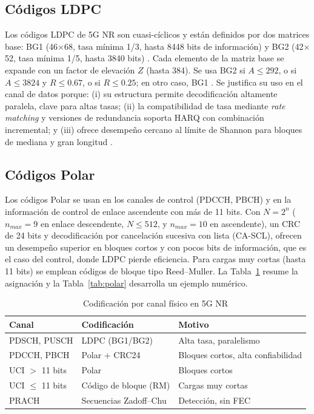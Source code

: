 \documentclass[conference]{IEEEtran}
\begin{document}
\subsection{Códigos LDPC}
Los códigos LDPC de 5G NR son cuasi-cíclicos y están definidos por dos matrices base: BG1 (46$\times$68, tasa mínima 1/3, hasta 8448 bits de información) y BG2 (42$\times$52, tasa mínima 1/5, hasta 3840 bits) \cite{richardson,ts38212}. Cada elemento de la matriz base se expande con un factor de elevación $Z$ (hasta 384). Se usa BG2 si $A\le292$, o si $A\le3824$ y $R\le0.67$, o si $R\le0.25$; en otro caso, BG1 \cite{ts38212}. Se justifica su uso en el canal de datos porque: (i) su estructura permite decodificación altamente paralela, clave para altas tasas; (ii) la compatibilidad de tasa mediante \textit{rate matching} y versiones de redundancia soporta HARQ con combinación incremental; y (iii) ofrece desempeño cercano al límite de Shannon para bloques de mediana y gran longitud \cite{richardson}.

\subsection{Códigos Polar}
Los códigos Polar \cite{arikan} se usan en los canales de control (PDCCH, PBCH) y en la información de control de enlace ascendente con más de 11 bits. Con $N=2^n$ ($n_{max}=9$ en enlace descendente, $N\le512$, y $n_{max}=10$ en ascendente), un CRC de 24 bits y decodificación por cancelación sucesiva con lista (CA-SCL), ofrecen un desempeño superior en bloques cortos y con pocos bits de información, que es el caso del control, donde LDPC pierde eficiencia. Para cargas muy cortas (hasta 11 bits) se emplean códigos de bloque tipo Reed--Muller. La Tabla~\ref{tab:canales} resume la asignación y la Tabla~\ref{tab:polar} desarrolla un ejemplo numérico.

\begin{table}[!t]
\caption{Codificación por canal físico en 5G NR}
\label{tab:canales}
\centering
\footnotesize
\renewcommand{\arraystretch}{1.15}
\begin{tabular}{p{1.8cm}p{2.5cm}p{3.2cm}}
\toprule
\textbf{Canal} & \textbf{Codificación} & \textbf{Motivo} \\
\midrule
PDSCH, PUSCH & LDPC (BG1/BG2) & Alta tasa, paralelismo \\
PDCCH, PBCH & Polar + CRC24 & Bloques cortos, alta confiabilidad \\
UCI $>$ 11 bits & Polar & Bloques cortos \\
UCI $\le$ 11 bits & Código de bloque (RM) & Cargas muy cortas \\
PRACH & Secuencias Zadoff--Chu & Detección, sin FEC \\
\bottomrule
\end{tabular}
\end{table}
\end{document}
